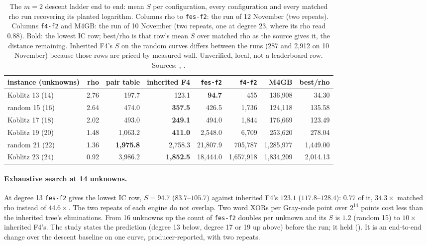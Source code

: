 \begin{table}[t]
\centering\small
\begin{tabular}{@{}lrrrrrrr@{}}
\toprule
instance (unknowns) & rho & pair table & inherited F4 & \texttt{fes-f2} & \texttt{f4-f2} & M4GB & best/rho \\
\midrule
Koblitz 13 (14) & 2.76 & 197.7 & 123.1 & \textbf{94.7} & 455 & 136{,}908 & 34.30 \\
random 15 (16) & 2.64 & 474.0 & \textbf{357.5} & 426.5 & 1{,}736 & 124{,}118 & 135.58 \\
Koblitz 17 (18) & 2.02 & 493.0 & \textbf{249.1} & 494.0 & 1{,}844 & 176{,}669 & 123.49 \\
Koblitz 19 (20) & 1.48 & 1{,}063.2 & \textbf{411.0} & 2{,}548.0 & 6{,}709 & 253{,}620 & 278.04 \\
random 21 (22) & 1.36 & \textbf{1{,}975.8} & 2{,}758.3 & 21{,}807.9 & 705{,}787 & 1{,}285{,}977 & 1{,}449.00 \\
Koblitz 23 (24) & 0.92 & 3{,}986.2 & \textbf{1{,}852.5} & 18{,}444.0 & 1{,}657{,}918 & 1{,}834{,}209 & 2{,}014.13 \\
\bottomrule
\end{tabular}
\caption[]{The $m=2$ descent ladder end to end: mean $S$ per configuration,
every configuration and every matched rho run recovering its planted
logarithm. Columns rho to \texttt{fes-f2}: the run of 12 November (two
repeats). Columns \texttt{f4-f2} and M4GB: the run of 10 November (two
repeats, one at degree 23, where its rho read 0.88). Bold: the lowest IC
row; best/rho is that row's mean $S$ over matched rho as the source gives
it, the distance remaining. Inherited F4's $S$ on the random curves differs
between the runs (287 and 2{,}912 on 10 November) because those rows are priced by
measured wall. Unverified, local, not a leaderboard row. Sources:
,
.}
\label{tab:bo-ladder}
\end{table}

\paragraph{Exhaustive search at 14 unknowns.} At degree 13 \texttt{fes-f2}
gives the lowest IC row, $S=94.7$ ($83.7$--$105.7$) against inherited F4's
$123.1$ ($117.8$--$128.4$): $0.77$ of it, $34.3\times$ matched rho instead of
$44.6\times$. The two repeats of each engine do not overlap. Two word XORs per
Gray-code point over $2^{14}$ points cost less than the inherited tree's
eliminations. From 16 unknowns up the count of \texttt{fes-f2} doubles per
unknown and its $S$ is $1.2$ (random 15) to $10\times$ inherited F4's.
The study states the prediction (degree 13 below, degree 17 or 19 up above)
before the run; it held
(). It is an end-to-end
change over the descent baseline on one curve, producer-reported, with two
repeats.

